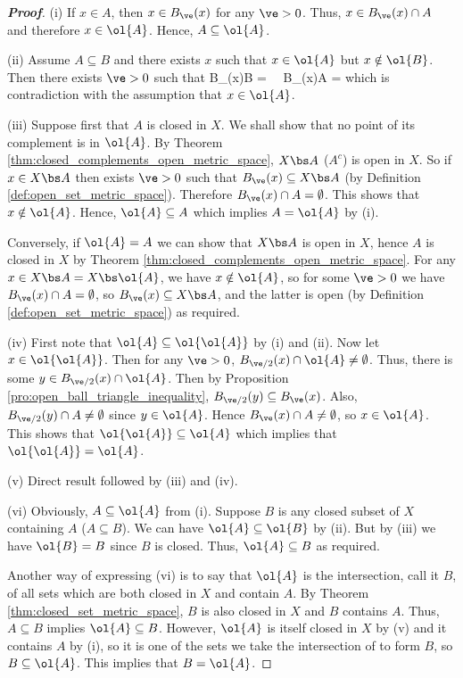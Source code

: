 \begin{proof}[\bf Proof]
\ben
\item [(i)] If $x\in A$, then $x\in B_\ve(x)$ for any $\ve>0$. Thus, $x\in B_\ve(x) \cap A$ and therefore $x\in \ol{A}$. Hence, $A\subseteq \ol{A}$.

\item [(ii)] Assume $A\subseteq B$ and there exists $x$ such that $x\in \ol{A}$ but $x\notin \ol{B}$. Then there exists $\ve>0$ such that
\be
B_\ve(x)\cap B = \emptyset\ \ra\ B_\ve(x)\cap A = \emptyset
\ee
which is contradiction with the assumption that $x\in \ol{A}$.

\item [(iii)] Suppose first that $A$ is closed in $X$. We shall show that no point of its complement is in $\ol{A}$. By Theorem \ref{thm:closed_complements_open_metric_space}, $X\bs A$ ($A^c$) is open in $X$. So if $x\in X\bs A$ then exists $\ve>0$ such that $B_\ve(x) \subseteq X\bs A$ (by Definition \ref{def:open_set_metric_space}). Therefore $B_{\ve}(x)\cap A = \emptyset$. This shows that $x\notin \ol{A}$. Hence, $\ol{A}\subseteq A$ which implies $A=\ol{A}$ by (i).

Conversely, if $\ol{A} = A$ we can show that $X\bs A$ is open in $X$, hence $A$ is closed in $X$ by Theorem \ref{thm:closed_complements_open_metric_space}. For any $x\in X\bs A = X\bs \ol{A}$, we have $x\notin \ol{A}$, so for some $\ve>0$ we have $B_\ve(x)\cap A = \emptyset$, so $B_\ve(x) \subseteq X\bs A$, and the latter is open (by Definition \ref{def:open_set_metric_space}) as required.

\item [(iv)] First note that $\ol{A} \subseteq \ol{\ol{A}}$ by (i) and (ii). Now let $x\in \ol{\ol{A}}$. Then for any $\ve >0$, $B_{\ve/2}(x) \cap \ol{A} \neq \emptyset$. Thus, there is some $y\in B_{\ve/2}(x) \cap \ol{A}$. Then by Proposition \ref{pro:open_ball_triangle_inequality}, $B_{\ve/2}(y) \subseteq B_\ve(x)$. Also, $B_{\ve/2}(y) \cap A \neq \emptyset$ since $y\in \ol{A}$. Hence $B_{\ve}(x) \cap A \neq \emptyset$, so $x\in \ol{A}$. This shows that $\ol{\ol{A}} \subseteq \ol{A}$ which implies that $\ol{\ol{A}} = \ol{A}$.

\item [(v)] Direct result followed by (iii) and (iv).

\item [(vi)] Obviously, $A\subseteq \ol{A}$ from (i). Suppose $B$ is any closed subset of $X$ containing $A$ ($A\subseteq B$). We can have $\ol{A}\subseteq \ol{B}$ by (ii). But by (iii) we have $\ol{B} = B$ since $B$ is closed. Thus, $\ol{A}\subseteq B$ as required.

Another way of expressing (vi) is to say that $\ol{A}$ is the intersection, call it $B$, of all sets which are both closed in $X$ and contain $A$. By Theorem \ref{thm:closed_set_metric_space}, $B$ is also closed in $X$ and $B$ contains $A$. Thus, $A\subseteq B$ implies $\ol{A} \subseteq B$. However, $\ol{A}$ is itself closed in $X$ by (v) and it contains $A$ by (i), so it is one of the sets we take the intersection of to form $B$, so $B\subseteq \ol{A}$. This implies that $B = \ol{A}$.
\een
\end{proof}



